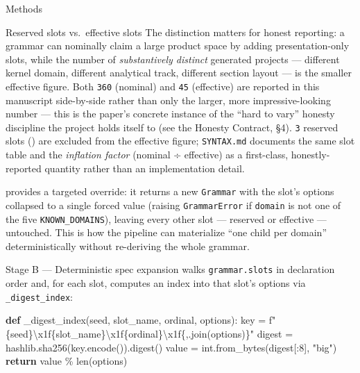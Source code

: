 \documentclass[
  ignorenonframetext,
]{beamer}
\newenvironment{Shaded}{}{}
\newcommand{\BuiltInTok}[1]{\textcolor[rgb]{0.00,0.50,0.00}{#1}}
\newcommand{\CharTok}[1]{\textcolor[rgb]{0.25,0.44,0.63}{#1}}
\newcommand{\ControlFlowTok}[1]{\textcolor[rgb]{0.00,0.44,0.13}{\textbf{#1}}}
\newcommand{\DecValTok}[1]{\textcolor[rgb]{0.25,0.63,0.44}{#1}}
\newcommand{\KeywordTok}[1]{\textcolor[rgb]{0.00,0.44,0.13}{\textbf{#1}}}
\newcommand{\NormalTok}[1]{#1}
\newcommand{\OperatorTok}[1]{\textcolor[rgb]{0.40,0.40,0.40}{#1}}
\newcommand{\SpecialCharTok}[1]{\textcolor[rgb]{0.25,0.44,0.63}{#1}}
\newcommand{\SpecialStringTok}[1]{\textcolor[rgb]{0.73,0.40,0.53}{#1}}
\newcommand{\StringTok}[1]{\textcolor[rgb]{0.25,0.44,0.63}{#1}}
\begin{document}
\begin{frame}{Methods}
\begin{block}{Reserved slots vs.~effective slots}
The distinction matters for honest reporting: a grammar can nominally
claim a large product space by adding presentation-only slots, while the
number of \emph{substantively distinct} generated projects --- different
kernel domain, different analytical track, different section layout ---
is the smaller effective figure. Both \texttt{360} (nominal) and
\texttt{45} (effective) are reported in this manuscript side-by-side
rather than only the larger, more impressive-looking number --- this is
the paper's concrete instance of the ``hard to vary'' honesty discipline
the project holds itself to (see the Honesty Contract, §4). \texttt{3}
reserved slots
() are
excluded from the effective figure; \texttt{SYNTAX.md} documents the
same slot table and the \emph{inflation factor} (nominal ÷ effective) as
a first-class, honestly-reported quantity rather than an implementation
detail.

 provides a targeted override:
it returns a new \texttt{Grammar} with the 
slot's options collapsed to a single forced value (raising
\texttt{GrammarError} if \texttt{domain} is not one of the five
\texttt{KNOWN\_DOMAINS}), leaving every other slot --- reserved or
effective --- untouched. This is how the pipeline can materialize ``one
child per domain'' deterministically without re-deriving the whole
grammar.
\end{block}

\begin{block}{Stage B --- Deterministic spec expansion}
\protect{}\label{stage-b-deterministic-spec-expansion}
 walks \texttt{grammar.slots} in
declaration order and, for each slot, computes an index into that slot's
options via \texttt{\_digest\_index}:

\begin{Shaded}
\begin{Highlighting}[]
\KeywordTok{def}\NormalTok{ \_digest\_index(seed, slot\_name, ordinal, options):}
\NormalTok{    key }\OperatorTok{=} \SpecialStringTok{f"}\SpecialCharTok{\{}\NormalTok{seed}\SpecialCharTok{\}}\CharTok{\textbackslash{}x1f}\SpecialCharTok{\{}\NormalTok{slot\_name}\SpecialCharTok{\}}\CharTok{\textbackslash{}x1f}\SpecialCharTok{\{}\NormalTok{ordinal}\SpecialCharTok{\}}\CharTok{\textbackslash{}x1f}\SpecialCharTok{\{}\StringTok{\textquotesingle{},\textquotesingle{}}\SpecialCharTok{.}\NormalTok{join(options)}\SpecialCharTok{\}}\SpecialStringTok{"}
\NormalTok{    digest }\OperatorTok{=}\NormalTok{ hashlib.sha256(key.encode()).digest()}
\NormalTok{    value }\OperatorTok{=} \BuiltInTok{int}\NormalTok{.from\_bytes(digest[:}\DecValTok{8}\NormalTok{], }\StringTok{"big"}\NormalTok{)}
    \ControlFlowTok{return}\NormalTok{ value }\OperatorTok{\%} \BuiltInTok{len}\NormalTok{(options)}
\end{Highlighting}
\end{Shaded}


\end{block}
\end{frame}
\end{document}
